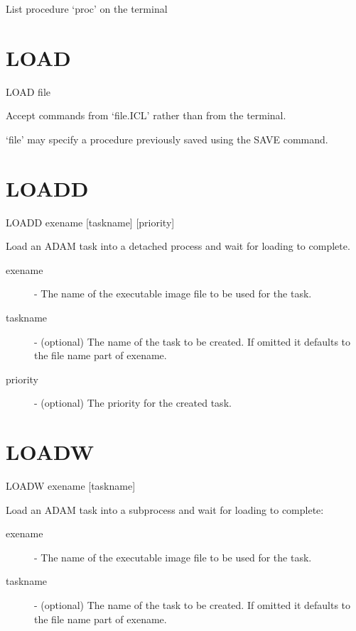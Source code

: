 \documentclass[twoside,11pt]{report}
\newcommand{\xlabel}[1]{}
\begin{document}
 List procedure `proc' on the terminal

\section{\xlabel{LOAD}LOAD\label{LOAD}}

    LOAD  file

 Accept commands from `file.ICL' rather than from the terminal.

 `file' may specify a procedure previously saved using the SAVE command.

\section{\xlabel{LOADD}LOADD\label{LOADD}}


    LOADD \hspace{.5cm} exename \hspace{.5cm} [taskname] \hspace{.5cm} [priority]

    Load an ADAM task into a detached process and wait for
    loading to complete.
\begin{description}

\item[exename] - The name of the executable image file to
            be used for the task.

\item[taskname] - (optional) The name of the task to be created.
            If omitted it defaults to the file name part of
            exename.

\item[priority] - (optional) The priority for the created task.

\end{description}

\section{\xlabel{LOADW}LOADW\label{LOADW}}


    LOADW \hspace{.5cm} exename \hspace{.5cm} [taskname]

    Load an ADAM task into a subprocess and wait for loading to complete:
\begin{description}

\item[exename] - The name of the executable image file to
            be used for the task.

\item[taskname] - (optional) The name of the task to be created.
            If omitted it defaults to the file name part of
            exename.

\end{description}
\end{document}
